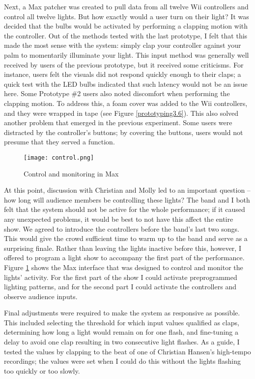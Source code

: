 Next, a Max patcher was created to pull data from all twelve Wii controllers and control all twelve lights. But how exactly would a user turn on their light? It was decided that the bulbs would be activated by performing a clapping motion with the controller. Out of the methods tested with the last prototype, I felt that this made the most sense with the system: simply clap your controller against your palm to momentarily illuminate your light. This input method was generally well received by users of the previous prototype, but it received some criticisms. For instance, users felt the visuals did not respond quickly enough to their claps; a quick test with the LED bulbs indicated that such latency would not be an issue here. Some Prototype \#2 users also noted discomfort when performing the clapping motion. To address this, a foam cover was added to the Wii controllers, and they were wrapped in tape (see Figure \ref{prototyping3.6}). This also solved another problem that emerged in the previous experiment. Some users were distracted by the controller's buttons; by covering the buttons, users would not presume that they served a function.

\begin{figure}
	\centering

	\texttt{[image: control.png]}
	\caption{Control and monitoring in Max}

	\label{prototyping3.7}
\end{figure}

At this point, discussion with Christian and Molly led to an important question -- how long will audience members be controlling these lights? The band and I both felt that the system should not be active for the whole performance; if it caused any unexpected problems, it would be best to not have this affect the entire show. We agreed to introduce the controllers before the band's last two songs. This would give the crowd sufficient time to warm up to the band and serve as a surprising finale. Rather than leaving the lights inactive before this, however, I offered to program a light show to accompany the first part of the performance. Figure \ref{prototyping3.7} shows the Max interface that was designed to control and monitor the lights' activity. For the first part of the show I could activate preprogrammed lighting patterns, and for the second part I could activate the controllers and observe audience inputs.

Final adjustments were required to make the system as responsive as possible. This included selecting the threshold for which input values qualified as claps, determining how long a light would remain on for one flash, and fine-tuning a delay to avoid one clap resulting in two consecutive light flashes. As a guide, I tested the values by clapping to the beat of one of Christian Hansen's high-tempo recordings; the values were set when I could do this without the lights flashing too quickly or too slowly.

